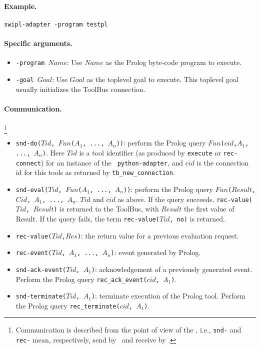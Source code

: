 \paragraph{Example.} {\tt swipl-adapter -program testpl}

\paragraph{Specific arguments.}
\begin{itemize}
\item {\tt -program $Name$}: Use $Name$ as the Prolog byte-code program
to execute.
\item {\tt -goal $Goal$}: Use $Goal$ as the toplevel goal to execute.
This toplevel goal usually initializes the ToolBus connection.
\end{itemize}

\paragraph{Communication.} \hspace{-0.3cm}\footnote{Communication is described
from the point of view of the \TB, i.e., {\tt snd-} and {\tt rec-}
mean, respectively, send by \TB\ and receive by \TB.}

\begin{itemize}
\item {\tt snd-do($Tid$, $Fun$($A_1$, ..., $A_n$))}: perform the Prolog
query
{\tt $Fun$($cid$,$A_1$, ..., $A_n$)}. Here $Tid$ is a tool identifier
(as produced by {\tt execute} or {\tt rec-connect}) for an instance of the {\tt
python-adapter}, and $cid$ is the connection id for this tools as returned
by {\tt tb\_new\_connection}.
\item {\tt snd-eval($Tid$, $Fun$($A_1$, ..., $A_n$))}: perform the Prolog
query
{\tt $Fun$($Result$,$Cid$, $A_1$, ..., $A_n$}. $Tid$ and $cid$ as above.
If the query succeeds, {\tt rec-value($Tid$, $Result$)} is returned
to the ToolBus, with $Result$ the first value of Result.
If the query fails, the term {\tt rec-value($Tid$, no)}
is returned.
\item {\tt rec-value($Tid$,$Res$)}: the return value for a previous evaluation request.
\item {\tt rec-event($Tid$, $A_1$, ..., $A_n$)}: event generated by Prolog.
\item {\tt snd-ack-event($Tid$, $A_1$)}: acknowledgement of
a previously generated event. Perform the Prolog query
{\tt rec\_ack\_event($cid$, $A_1$)}.
\item {\tt snd-terminate($Tid$, $A_1$)}: terminate execution of the
Prolog tool. Perform the Prolog query
{\tt rec\_terminate($cid$, $A_1$)}.
\end{itemize}


